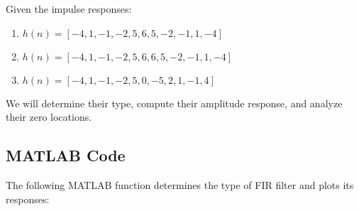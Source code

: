 \documentclass[a4paper,12pt]{article}
\begin{document}
Given the impulse responses:

\begin{enumerate}[label=(\alph*)]
    \item \( h(n) = [-4, 1, -1, -2, 5, 6, 5, -2, -1, 1, -4] \)
    \item \( h(n) = [-4, 1, -1, -2, 5, 6, 6, 5, -2, -1, 1, -4] \)
    \item \( h(n) = [-4, 1, -1, -2, 5, 0, -5, 2, 1, -1, 4] \)
\end{enumerate}

We will determine their type, compute their amplitude response, and analyze their zero locations.

\subsection{MATLAB Code}

The following MATLAB function determines the type of FIR filter and plots its responses:
\end{document}
